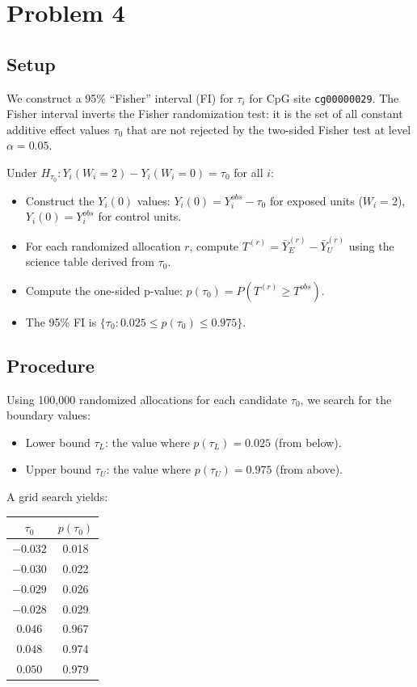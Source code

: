 \documentclass[11pt]{article}
\begin{document}
\section*{Problem 4}

\subsection*{Setup}

We construct a 95\% ``Fisher'' interval (FI) for $\tau_i$ for CpG site \texttt{cg00000029}. The Fisher interval inverts the Fisher randomization test: it is the set of all constant additive effect values $\tau_0$ that are not rejected by the two-sided Fisher test at level $\alpha = 0.05$.

Under $H_{\tau_0}: Y_i(W_i=2) - Y_i(W_i=0) = \tau_0$ for all $i$:
\begin{itemize}
  \item Construct the $Y_i(0)$ values: $Y_i(0) = Y_i^{obs} - \tau_0$ for exposed units ($W_i=2$), $Y_i(0) = Y_i^{obs}$ for control units.
  \item For each randomized allocation $r$, compute $T^{(r)} = \bar{Y}^{(r)}_E - \bar{Y}^{(r)}_U$ using the science table derived from $\tau_0$.
  \item Compute the one-sided p-value: $p(\tau_0) = P(T^{(r)} \geq T^{obs})$.
  \item The 95\% FI is $\{\tau_0: 0.025 \leq p(\tau_0) \leq 0.975\}$.
\end{itemize}

\subsection*{Procedure}

Using 100,000 randomized allocations for each candidate $\tau_0$, we search for the boundary values:
\begin{itemize}
  \item Lower bound $\tau_L$: the value where $p(\tau_L) = 0.025$ (from below).
  \item Upper bound $\tau_U$: the value where $p(\tau_U) = 0.975$ (from above).
\end{itemize}

A grid search yields:
\begin{center}
\begin{tabular}{cc}
\toprule
$\tau_0$ & $p(\tau_0)$ \\
\midrule
$-0.032$ & 0.018 \\
$-0.030$ & 0.022 \\
$-0.029$ & 0.026 \\
$-0.028$ & 0.029 \\
\midrule
$0.046$ & 0.967 \\
$0.048$ & 0.974 \\
$0.050$ & 0.979 \\
\bottomrule
\end{tabular}
\end{center}
\end{document}
